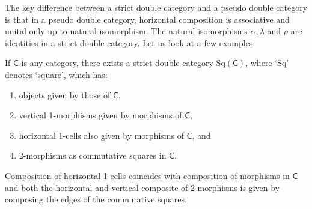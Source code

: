 \documentclass[oneside,final]{ucr}
\theoremstyle{definition}
\begin{document}
{The key difference between a strict double category and a pseudo double category is that in a pseudo double category, horizontal composition is associative and unital only up to natural isomorphism. The natural isomorphisms $\alpha, \lambda$ and $\rho$ are identities in a strict double category. Let us look at a few examples.

If $\mathsf{C}$ is any category, there exists a strict double category Sq$(\mathsf{C})$, where `Sq' denotes `square', which has:
\begin{enumerate}
\item{objects given by those of $\mathsf{C}$,}
\item{vertical 1-morphisms given by morphisms of $\mathsf{C}$,}
\item{horizontal 1-cells also given by morphisms of $\mathsf{C}$, and}
\item{2-morphisms as commutative squares in $\mathsf{C}$.}
\end{enumerate}
Composition of horizontal 1-cells coincides with composition of morphisms in $\mathsf{C}$ and both the horizontal and vertical composite of 2-morphisms is given by composing the edges of the commutative squares.

}
\end{document}
